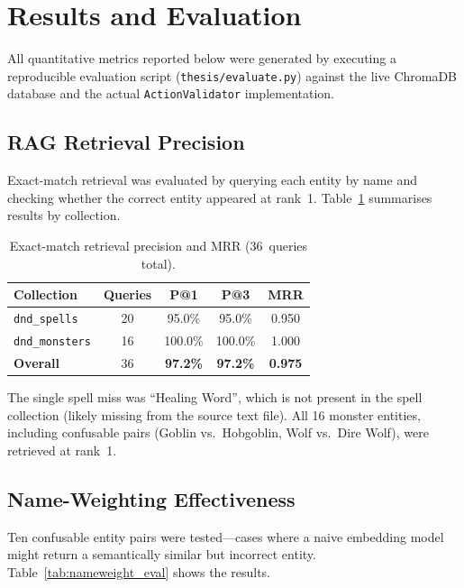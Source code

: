 \documentclass[12pt,a4paper]{article}
\begin{document}
\section{Results and Evaluation}
\label{sec:results}

All quantitative metrics reported below were generated by executing a
reproducible evaluation script (\texttt{thesis/evaluate.py}) against the
live ChromaDB database and the actual \texttt{ActionValidator}
implementation.

\subsection{RAG Retrieval Precision}
\label{sec:retrieval_eval}

Exact-match retrieval was evaluated by querying each entity by name and
checking whether the correct entity appeared at rank~1.
Table~\ref{tab:retrieval} summarises results by collection.

\begin{table}[H]
\centering
\caption{Exact-match retrieval precision and MRR (36~queries total).}
\label{tab:retrieval}
\small
\begin{tabular}{lcccc}
\toprule
\textbf{Collection} & \textbf{Queries} & \textbf{P@1} & \textbf{P@3} & \textbf{MRR} \\
\midrule
\texttt{dnd\_spells}   & 20 & 95.0\% & 95.0\% & 0.950 \\
\texttt{dnd\_monsters} & 16 & 100.0\% & 100.0\% & 1.000 \\
\midrule
\textbf{Overall}       & 36 & \textbf{97.2\%} & \textbf{97.2\%} & \textbf{0.975} \\
\bottomrule
\end{tabular}
\end{table}

The single spell miss was ``Healing Word'', which is not present in the
spell collection (likely missing from the source text file). All 16
monster entities, including confusable pairs (Goblin vs.\ Hobgoblin,
Wolf vs.\ Dire Wolf), were retrieved at rank~1.

\subsection{Name-Weighting Effectiveness}

Ten confusable entity pairs were tested---cases where a naive embedding
model might return a semantically similar but incorrect entity.
Table~\ref{tab:nameweight_eval} shows the results.
\end{document}
